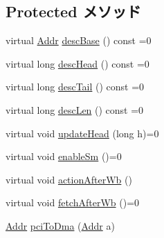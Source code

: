 \subsection*{Protected メソッド}
\begin{DoxyCompactItemize}
\item 
virtual \hyperlink{base_2types_8hh_af1bb03d6a4ee096394a6749f0a169232}{Addr} \hyperlink{classIGbE_1_1DescCache_aa8bdc83aee2be5e0eaa7a1f7f1f284e2}{descBase} () const =0
\item 
virtual long \hyperlink{classIGbE_1_1DescCache_af413050780b6b8b2fe0793fff12037e3}{descHead} () const =0
\item 
virtual long \hyperlink{classIGbE_1_1DescCache_a88ebc5d9eb88ca9148465557e9a66c1c}{descTail} () const =0
\item 
virtual long \hyperlink{classIGbE_1_1DescCache_a8eb35163568b01fa17aa47b23a80f90c}{descLen} () const =0
\item 
virtual void \hyperlink{classIGbE_1_1DescCache_af48912789332a0283480cd85c7197f15}{updateHead} (long h)=0
\item 
virtual void \hyperlink{classIGbE_1_1DescCache_a9b931707aadb26e13262c50e0dd87006}{enableSm} ()=0
\item 
virtual void \hyperlink{classIGbE_1_1DescCache_a22d736f39e553f2f93799dc2e0eea912}{actionAfterWb} ()
\item 
virtual void \hyperlink{classIGbE_1_1DescCache_abe568c102619a35d2aa1a37c64dff086}{fetchAfterWb} ()=0
\item 
\hyperlink{base_2types_8hh_af1bb03d6a4ee096394a6749f0a169232}{Addr} \hyperlink{classIGbE_1_1DescCache_aaeea87c73c95205c88d11e03fe8f48b9}{pciToDma} (\hyperlink{base_2types_8hh_af1bb03d6a4ee096394a6749f0a169232}{Addr} a)
\end{DoxyCompactItemize}
